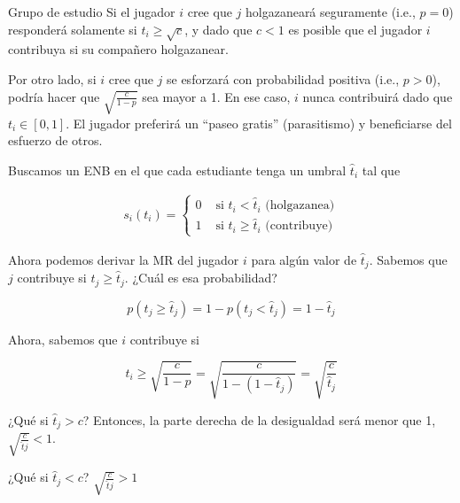 \documentclass[12pt]{article}
\begin{document}
\begin{exbox}{Grupo de estudio}
	Si el jugador $ i $ cree que $ j $ holgazaneará seguramente (i.e., $ p=0 $) responderá solamente si $ t_i \geq \sqrt{c} $, y dado que $ c<1 $ es posible que el jugador $ i $ contribuya si su compañero holgazanear.

	Por otro lado, si $ i $ cree que $ j $ se esforzará con probabilidad positiva (i.e., $ p > 0 $), podría hacer que $ \sqrt{\frac{c}{1-p}} $ sea mayor a 1. En ese caso, $ i $ nunca contribuirá dado que $ t_i \in [0, 1] $. El jugador preferirá un ``paseo gratis'' (parasitismo) y beneficiarse del esfuerzo de otros.

	Buscamos un ENB en el que cada estudiante tenga un umbral $ \hat{t}_i $ tal que

	\begin{align*}
		s_i(t_i)=\begin{cases}
			0 & \text{ si } t_i < \hat{t}_i \text{ (holgazanea)}    \\
			1 & \text{ si } t_i \geq \hat{t}_i \text{ (contribuye)}
		\end{cases}
	\end{align*}

	Ahora podemos derivar la MR del jugador $ i $ para algún valor de  $ \hat{t}_j $.
	Sabemos que $ j $ contribuye si $ t_j \geq \hat{t}_j $. ¿Cuál es esa probabilidad?

	$$ p(t_j \geq \hat{t}_j ) = 1 - p(t_j < \hat{t}_j) = 1-\hat{t}_j$$

	\begin{center}
	\end{center}

	Ahora, sabemos que $i$ contribuye si

	$$ t_i \geq \sqrt{\frac{c}{1-p}} = \sqrt{\frac{c}{1-(1-\hat{t}_j)}} = \sqrt{\frac{c}{\hat{t}_j}}$$

	\begin{myitemize}
		\item ¿Qué si $ \hat{t}_j > c $? Entonces, la parte derecha de la desigualdad será menor que 1, $ \sqrt{\frac{c}{\hat{t}j}} <1 $.
		\item ¿Qué si $ \hat{t}_j < c $? $ \sqrt{\frac{c}{\hat{t}j}} > 1 $
	\end{myitemize}


\end{exbox}
\end{document}
